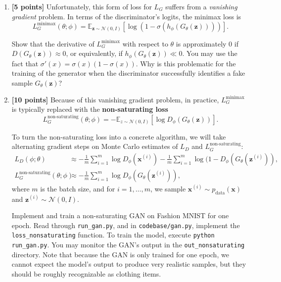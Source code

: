 \documentclass{article}
\newcommand{\bx}{{\boldsymbol{x}}}
\newcommand{\bz}{{\boldsymbol{z}}}
\begin{document}
\begin{enumerate}
    \item \textbf{[5 points]} Unfortunately, this form of loss for $L_G$ suffers from a \emph{vanishing gradient} problem. In terms of the discriminator's logits, the minimax loss is  \[
     L_G^{\text{minimax}}(\theta; \phi) = \mathbb{E}_{\bz \sim \mathcal{N}(0,I)}[ \log (1 - \sigma(h_\phi(G_\theta(\bz)))) ] .
    \]
    
    Show that the derivative of $L_G^{\text{minimax}}$ with respect to $\theta$ is approximately $0$ if $D(G_\theta(\bz)) \approx 0$, or equivalently, if $h_\phi(G_\theta(\bz)) \ll 0$. You may use the fact that $\sigma'(x) = \sigma(x) (1 - \sigma(x))$. Why is this problematic for the training of the generator when the discriminator successfully identifies a fake sample $G_\theta(\bz)$?
    
    \item \textbf{[10 points]} Because of this vanishing gradient problem, in practice, $L_G^{\text{minimax}}$ is typically replaced with the \textbf{non-saturating loss}
    \[
        L_G^{\text{non-saturating}}(\theta; \phi) = -\mathbb{E}_{z \sim \mathcal{N}(0,I)} [ \log D_\phi(G_\theta(\bz)) ] .
    \] 
    
    To turn the non-saturating loss into a concrete algorithm, we will take alternating gradient steps on Monte Carlo estimates of $L_D$ and $L^{\text{non-saturating}}_G$: 
    \begin{align*}
         L_D(\phi; \theta) &\approx -\frac{1}{m}\sum_{i=1}^m \log D_\phi(\bx^{(i)}) - \frac{1}{m}\sum_{i=1}^m \log(1 - D_\phi(G_\theta(\bz^{(i)})), \\
        L^{\text{non-saturating}}_G(\theta; \phi) &\approx -\frac{1}{m}\sum_{i=1}^m \log D_\phi(G_\theta(\bz^{(i)})),
    \end{align*} where $m$ is the batch size, and for $i = 1, \ldots, m$, we sample $\bx^{(i)} \sim p_{\text{data}}(\bx)$ and $\bz^{(i)} \sim \mathcal{N}(0,I)$.
    
    Implement and train a non-saturating GAN on Fashion MNIST for one epoch. Read through \texttt{run\_gan.py}, and in \texttt{codebase/gan.py}, implement the \texttt{loss\_nonsaturating} function. To train the model, execute \texttt{python run\_gan.py}. You may monitor the GAN's output in the \texttt{out\_nonsaturating} directory. Note that because the GAN is only trained for one epoch, we cannot expect the model's output to produce very realistic samples, but they should be roughly recognizable as clothing items.
\end{enumerate}
\end{document}
